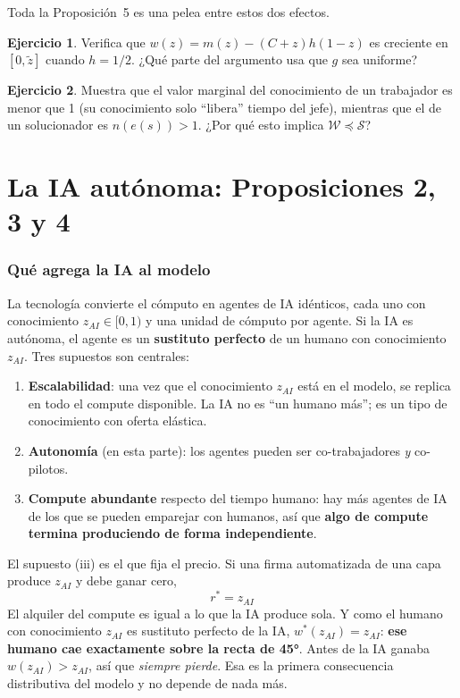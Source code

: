 \documentclass[11pt]{article}
\theoremstyle{definition}
\newtheorem{ejercicio}{Ejercicio}
\theoremstyle{remark}
\newcommand{\zai}{z_{AI}}
\newcommand{\zt}{\tilde z}
\newcommand{\W}{\mathcal W}
\newcommand{\Sset}{\mathcal S}
\newcommand{\below}{\preceq}
\begin{document}
Toda la Proposición~5 es una pelea entre estos dos efectos.

\begin{ejercicio}
Verifica que $w(z)=m(z)-(C+z)h(1-z)$ es creciente en $[0,\zt]$ cuando $h=1/2$. ¿Qué parte del argumento usa que $g$ sea uniforme?
\end{ejercicio}

\begin{ejercicio}
Muestra que el valor marginal del conocimiento de un trabajador es menor que 1 (su conocimiento solo ``libera'' tiempo del jefe), mientras que el de un solucionador es $n(e(s))>1$. ¿Por qué esto implica $\W\below\Sset$?
\end{ejercicio}

\part{La IA autónoma: Proposiciones 2, 3 y 4}

\section{Qué agrega la IA al modelo}

La tecnología convierte el cómputo en agentes de IA idénticos, cada uno con conocimiento
$\zai\in[0,1)$ y una unidad de cómputo por agente. Si la IA es autónoma, el agente es un
\textbf{sustituto perfecto} de un humano con conocimiento $\zai$. Tres supuestos son centrales:

\begin{enumerate}[label=(\roman*)]
  \item \textbf{Escalabilidad}: una vez que el conocimiento $\zai$ está en el modelo, se replica en
  todo el compute disponible. La IA no es ``un humano más''; es un tipo de conocimiento con oferta
  elástica.
  \item \textbf{Autonomía} (en esta parte): los agentes pueden ser co-trabajadores \emph{y} co-pilotos.
  \item \textbf{Compute abundante} respecto del tiempo humano: hay más agentes de IA de los que se
  pueden emparejar con humanos, así que \textbf{algo de compute termina produciendo de forma
  independiente}.
\end{enumerate}

El supuesto (iii) es el que fija el precio. Si una firma automatizada de una capa produce $\zai$ y
debe ganar cero,
\begin{equation}\label{eq:r}
  \boxed{\,r^{*}=\zai\,}
\end{equation}
El alquiler del compute es igual a lo que la IA produce sola. Y como el humano con conocimiento
$\zai$ es sustituto perfecto de la IA, $w^{*}(\zai)=\zai$: \textbf{ese humano cae exactamente sobre la
recta de 45°}. Antes de la IA ganaba $w(\zai)>\zai$, así que \emph{siempre pierde}. Esa es la primera
consecuencia distributiva del modelo y no depende de nada más.
\end{document}

